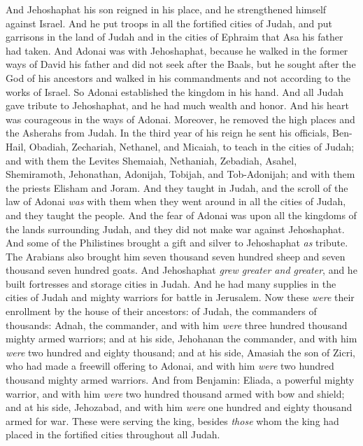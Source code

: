 \begin{biblechapter} %
 And Jehoshaphat his son reigned in his place, and he strengthened himself against Israel.
\verse And he put troops in all the fortified cities of Judah, and put garrisons in the land of Judah and in the cities of Ephraim that Asa his father had taken.
\verse And Adonai was with Jehoshaphat, because he walked in the former ways of David his father and did not seek after the Baals,
\verse but he sought after the God of his ancestors and walked in his commandments and not according to the works of Israel.
\verse So Adonai established the kingdom in his hand. And all Judah gave tribute to Jehoshaphat, and he had much wealth and honor.
\verse And his heart was courageous in the ways of Adonai. Moreover, he removed the high places and the Asherahs from Judah.
\verse In the third year of his reign he sent his officials, Ben-Hail, Obadiah, Zechariah, Nethanel, and Micaiah, to teach in the cities of Judah;
\verse and with them the Levites Shemaiah, Nethaniah, Zebadiah, Asahel, Shemiramoth, Jehonathan, Adonijah, Tobijah, and Tob-Adonijah; and with them the priests Elisham and Joram.
\verse And they taught in Judah, and the scroll of the law of Adonai \textit{was} with them when they went around in all the cities of Judah, and they taught the people.
\verse And the fear of Adonai was upon all the kingdoms of the lands surrounding Judah, and they did not make war against Jehoshaphat.
\verse And some of the Philistines brought a gift and silver to Jehoshaphat \textit{as} tribute. The Arabians also brought him seven thousand seven hundred sheep and seven thousand seven hundred goats.
\verse And Jehoshaphat \textit{grew greater and greater}, and he built fortresses and storage cities in Judah.
\verse And he had many supplies in the cities of Judah and mighty warriors for battle in Jerusalem.
\verse Now these \textit{were} their enrollment by the house of their ancestors: of Judah, the commanders of thousands: Adnah, the commander, and with him \textit{were} three hundred thousand mighty armed warriors;
\verse and at his side, Jehohanan the commander, and with him \textit{were} two hundred and eighty thousand;
\verse and at his side, Amasiah the son of Zicri, who had made a freewill offering to Adonai, and with him \textit{were} two hundred thousand mighty armed warriors.
\verse And from Benjamin: Eliada, a powerful mighty warrior, and with him \textit{were} two hundred thousand armed with bow and shield;
\verse and at his side, Jehozabad, and with him \textit{were} one hundred and eighty thousand armed for war.
\verse These were serving the king, besides \textit{those} whom the king had placed in the fortified cities throughout all Judah.
\end{biblechapter}

